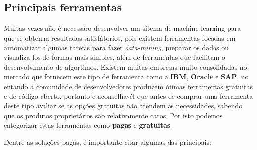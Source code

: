\subsection{Principais ferramentas}
\label{subsec:ferramentas}
Muitas vezes não é necessáro desenvolver um sitema de machine learning para que se obtenha resultados satisfátórios, pois existem
ferramentas focadas em automatizar algumas tarefas para fazer \textit{data-mining}, preparar os dados ou visualiza-los de formas mais 
simples, além de ferramentas que facilitam o desenvolvimento de algortimos. Existem muitas empresas muito consolidadas no mercado 
que fornecem este tipo de ferramenta como a \textbf{IBM}, \textbf{Oracle} e \textbf{SAP}, no entando a comunidade de desenvolvedores
produzem ótimas ferramentas gratuitas e de código aberto, portanto é aconselhavél que antes de comprar uma ferramenta deste tipo
avaliar se as opções gratuitas não atendem as necessidades, sabendo que os produtos proprietários são relativamente caros. Por 
isto podemos categorizar estas ferramentas como \textbf{pagas} e \textbf{gratuitas}.


Dentre as soluções pagas, é importante citar algumas das principais:

